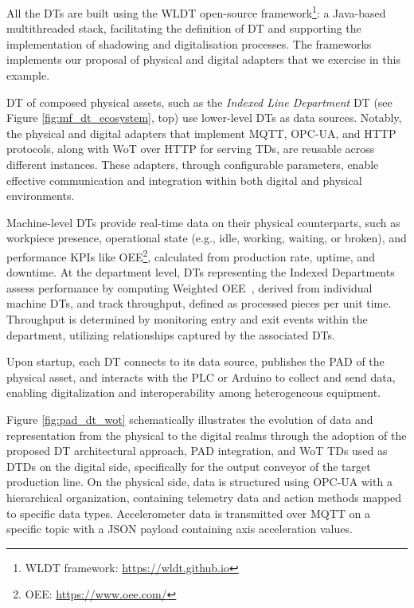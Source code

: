 All the \acp{DT} are built using the \ac{WLDT} open-source framework\footnote{WLDT framework: \url{https://wldt.github.io}}: a Java-based multithreaded stack, facilitating the definition of \ac{DT} and supporting the implementation of shadowing and digitalisation processes.
The frameworks implements our proposal of physical and digital adapters that we exercise in this example.

\ac{DT} of composed physical assets, such as the \textit{Indexed Line Department} \ac{DT} (see Figure \ref{fig:mf_dt_ecosystem}, top) use lower-level \acp{DT} as data sources.
Notably, the physical and digital adapters that implement MQTT, OPC-UA, and HTTP protocols, along with \ac{WoT} over HTTP for serving \acp{TD}, are reusable across different instances.
These adapters, through configurable parameters, enable effective communication and integration within both digital and physical environments.

Machine-level \acp{DT} provide real-time data on their physical counterparts, such as workpiece presence, operational state
(e.g., idle, working, waiting, or broken),
and performance KPIs like \ac{OEE}\footnote{OEE: \url{https://www.oee.com/}}, calculated from production rate, uptime, and downtime.
%
At the department level, \acp{DT} representing the Indexed Departments assess performance by computing Weighted \ac{OEE}~\cite{OEE-manufacturing-cell-Gamberini-2017,Introduction-to-TPM-total-productive-maintenance-Nakajima-1995}, derived from individual machine \acp{DT}, and track throughput, defined as processed pieces per unit time.
Throughput is determined by monitoring entry and exit events within the department, utilizing relationships captured by the associated \acp{DT}.

Upon startup, each \ac{DT} connects to its data source, publishes the \ac{PAD} of the physical asset, and interacts with the PLC or Arduino to collect and send data, enabling digitalization and interoperability among heterogeneous equipment. 

Figure \ref{fig:pad_dt_wot} schematically illustrates the evolution of data and representation from the physical to the digital realms through the adoption of the proposed \ac{DT} architectural approach, \ac{PAD} integration, and \ac{WoT} \acp{TD} used as \acp{DTD} on the digital side, specifically for the output conveyor of the target production line.
On the physical side, data is structured using OPC-UA with a hierarchical organization, containing telemetry data and action methods mapped to specific data types.
Accelerometer data is transmitted over MQTT on a specific topic with a JSON payload containing axis acceleration values. 

